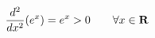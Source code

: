 \documentclass[preview]{standalone}
\begin{document}
\begin{align*}
\special{dvisvgm:raw <g id='unique000'>}\frac{d^2}{dx^2}(e^x) = e^x > 0 \qquad \forall x \in \mathbf{R}\special{dvisvgm:raw </g>}
\end{align*}
\end{document}
